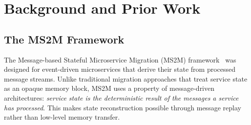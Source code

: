\documentclass[conference]{IEEEtran}
\begin{document}



\section{Background and Prior Work}
\label{sec:background}

\subsection{The MS2M Framework}
\label{sec:ms2m}

The Message-based Stateful Microservice Migration (MS2M)
framework~\cite{dinhtuan2022ms2m} was designed for event-driven microservices
that derive their state from processed message streams. Unlike traditional
migration approaches that treat service state as an opaque memory block, MS2M
uses a property of message-driven architectures: \textit{service state
is the deterministic result of the messages a service has processed}. This
makes state reconstruction possible through message replay rather than low-level
memory transfer.
\end{document}

